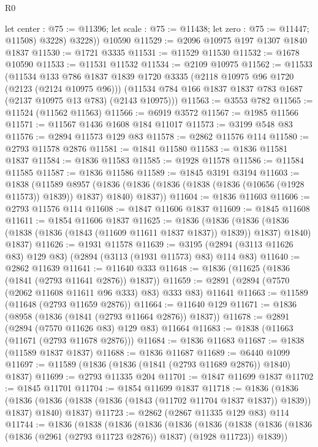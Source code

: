 \begin{lexlean}{R0}
\begin{coremodule}
          let center : @75 := @11396; let scale : @75 := @11438; let zero : @75 := @11447; @11508)
          @3228)
        @3228))
    @10590
@11529 := @2096 @10975 @197 @1307 @1840 @1837
@11530 := @1721 @3335
@11531 := @11529 @11530
@11532 := @1678 @10590
@11533 := @11531 @11532
@11534 := @2109 @10975
@11562 := @11533
    (@11534
      @133
      @786
      @1837
      @1839
      @1720
      @3335
      (@2118 @10975 @96 @1720 (@2123 (@2124 @10975 @96)))
      (@11534 @784 @166 @1837 @1837 @783 @1687 (@2137 @10975 @13 @783) (@2143 @10975)))
@11563 := @3553 @782
@11565 := @11524 (@11562 @11563)
@11566 := @6919 @3572
@11567 := @1985 @11566
@11571 := @11567 @1436 @1608 @184 @11017
@11573 := @3199 @548 @83
@11576 := @2894 @11573 @129 @83
@11578 := @2862 @11576 @114
@11580 := @2793 @11578 @2876
@11581 := @1841 @11580
@11583 := @1836 @11581 @1837
@11584 := @1836 @11583
@11585 := @1928 @11578
@11586 := @11584 @11585
@11587 := @1836 @11586
@11589 := @1845 @3191 @3194
@11603 := @1838
    (@11589
      @8957
      (@1836 (@1836 (@1836 (@1838 (@1836 (@10656 (@1928 @11573)) @1839)) @1837) @1840) @1837))
@11604 := @1836 @11603
@11606 := @2793 @11576 @114
@11608 := @1847 @11606 @1837
@11609 := @1845 @11608
@11611 := @1854 @11606 @1837
@11625 := @1836
    (@1836
      (@1836 (@1836 (@1838 (@1836 (@1843 (@11609 @11611 @1837 @1837)) @1839)) @1837) @1840)
      @1837)
@11626 := @1931 @11578
@11639 := @3195 (@2894 (@3113 @11626 @83) @129 @83) (@2894 (@3113 (@1931 @11573) @83) @114 @83)
@11640 := @2862 @11639
@11641 := @11640 @333
@11648 := @1836 (@11625 (@1836 (@1841 (@2793 @11641 @2876)) @1837))
@11659 := @2891 (@2894 (@7570 (@2062 @11608 @11611 @96 @333) @83) @333 @83) @11641
@11663 := @11589 (@11648 (@2793 @11659 @2876))
@11664 := @11640 @129
@11671 := @1836 (@8958 (@1836 (@1841 (@2793 @11664 @2876)) @1837))
@11678 := @2891 (@2894 (@7570 @11626 @83) @129 @83) @11664
@11683 := @1838 (@11663 (@11671 (@2793 @11678 @2876)))
@11684 := @1836 @11683
@11687 := @1838 (@11589 @1837 @1837)
@11688 := @1836 @11687
@11689 := @6440 @1099
@11697 := @11589 (@1836 (@1836 (@1841 (@2793 @11689 @2876)) @1840) @1837)
@11699 := @2793 @11335 @204
@11701 := @1847 @11699 @1837
@11702 := @1845 @11701
@11704 := @1854 @11699 @1837
@11718 := @1836
    (@1836
      (@1836 (@1836 (@1838 (@1836 (@1843 (@11702 @11704 @1837 @1837)) @1839)) @1837) @1840)
      @1837)
@11723 := @2862 (@2867 @11335 @129 @83) @114
@11744 := @1836
    (@1838
      (@1836
        (@1836
          (@1836
            (@1836
              (@1838
                (@1836 (@1836 (@1836 (@2961 (@2793 @11723 @2876)) @1837) (@1928 @11723)) @1839))

\end{coremodule}
\end{lexlean}
